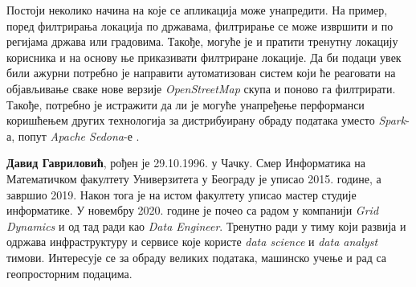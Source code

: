 \documentclass[12pt,oneside]{memoir}
\begin{document}
Постоји неколико начина на које се апликација може унапредити. На пример, поред филтрирања локација по државама, филтрирање се може извршити и по регијама држава или градовима. Такође, могуће је и пратити тренутну локацију корисника и на основу ње приказивати филтриране локације. Да би подаци увек били ажурни потребно је направити аутоматизован систем који ће реаговати на објављивање сваке нове верзије \textit{OpenStreetMap} скупа и поново га филтрирати. Такође, потребно је истражити да ли је могуће унапређење перформанси коришћењем других технологија за дистрибуирану обраду података уместо \textit{Spark}-а, попут  \textit{Apache Sedona}-е \cite{apache_sedona}.



\literatura

\backmatter

\begin{biografija}
\textbf{Давид Гавриловић}, рођен је 29.10.1996. у Чачку. Смер Информатика на Математичком факултету Универзитета у Београду је уписао 2015. године, а завршио 2019. Након тога је на истом факултету уписао мастер студије информатике. У новембру 2020. године је почео са радом у компанији \textit{Grid Dynamics} и од тад ради као \textit{Data Engineer}. Тренутно ради у тиму који развија и одржава инфраструктуру и сервисе које користе \textit{data science} и \textit{data analyst} тимови. Интересује се за обраду великих података, машинско учење и рад са геопросторним подацима.
\end{biografija}
\end{document}
